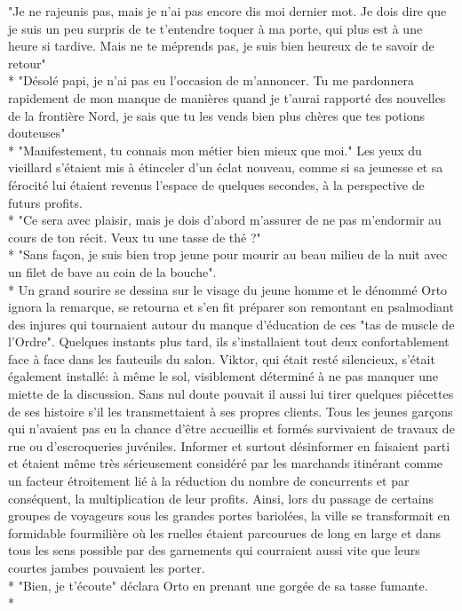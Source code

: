 \documentclass{book}
\begin{document}
"Je ne rajeunis pas, mais je n'ai pas encore dis moi dernier mot. Je dois dire que je suis un peu surpris de te t'entendre toquer à ma porte, qui plus est à une heure si tardive. Mais ne te méprends pas, je suis bien heureux de te savoir de retour"\\*
"Désolé papi, je n'ai pas eu l'occasion de m'annoncer. Tu me pardonnera rapidement de mon manque de manières quand je t'aurai rapporté des nouvelles de la frontière Nord, je sais que tu les vends bien plus chères que tes potions douteuses"\\*
"Manifestement, tu connais mon métier bien mieux que moi." Les yeux du vieillard s'étaient mis à étinceler d'un éclat nouveau, comme si sa jeunesse et sa férocité lui étaient revenus l'espace de quelques secondes, à la perspective de futurs profits.\\*
"Ce sera avec plaisir, mais je dois d'abord m'assurer de ne pas m'endormir au cours de ton récit. Veux tu une tasse de thé ?"\\*
"Sans façon, je suis bien trop jeune pour mourir au beau milieu de la nuit avec un filet de bave au coin de la bouche".\\*
Un grand sourire se dessina sur le visage du jeune homme et le dénommé Orto ignora la remarque, se retourna et s'en fit préparer son remontant en psalmodiant des injures qui tournaient autour du manque d'éducation de ces "tas de muscle de l'Ordre".
Quelques instants plus tard, ils s'installaient tout deux confortablement face à face dans les fauteuils du salon. Viktor, qui était resté silencieux, s'était également installé: à même le sol, visiblement déterminé à ne pas manquer une miette de la discussion. Sans nul doute pouvait il aussi lui tirer quelques piécettes de ses histoire s'il les transmettaient à ses propres clients. Tous les jeunes garçons qui n'avaient pas eu la chance d'être accueillis et formés survivaient de travaux de rue ou d'escroqueries juvéniles. Informer et surtout désinformer en faisaient parti et étaient même très sérieusement considéré par les marchands itinérant comme un facteur étroitement lié à la réduction du nombre de concurrents et par conséquent, la multiplication de leur profits. Ainsi, lors du passage de certains groupes de voyageurs sous les grandes portes bariolées, la ville se transformait en formidable fourmilière où les ruelles étaient parcourues de long en large et dans tous les sens possible par des garnements qui courraient aussi vite que leurs courtes jambes pouvaient les porter. \\*
"Bien, je t'écoute" déclara Orto en prenant une gorgée de sa tasse fumante.\\*
\end{document}
